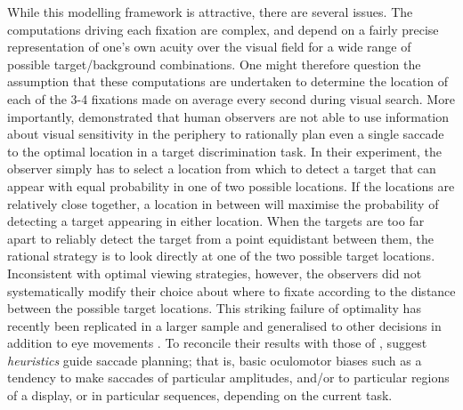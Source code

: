 While this modelling framework is attractive, there are several issues. The computations driving each fixation are complex, and depend on a fairly precise representation of one's own acuity over the visual field for a wide range of possible target/background combinations. One might therefore question the assumption that these computations are undertaken to determine the location of each of the 3-4 fixations made on average every second during visual search. More importantly,  \cite{morvan-maloney2012} demonstrated that human observers are not able to use information about visual sensitivity in the periphery to rationally plan even a single saccade to the optimal location in a target discrimination task. In their experiment, the observer simply has to select a location from which to detect a target that can appear with equal probability in one of two possible locations. If the locations are relatively close together, a location in between will maximise the probability of detecting a target appearing in either location. When the targets are too far apart to reliably detect the target from a point equidistant between them, the rational strategy is to look directly at one of the two possible target locations. Inconsistent with optimal viewing strategies, however, the observers did not systematically modify their choice about where to fixate according to the distance between the possible target locations. This striking failure of optimality has recently been replicated in a larger sample and generalised to other decisions in addition to eye movements  \citep{clarke-hunt2015}. To reconcile their results with those of  \cite{najemnik-geisler2008},  \cite{morvan-maloney2012} suggest \textit{heuristics} guide saccade planning; that is, basic oculomotor biases such as a tendency to make saccades of particular amplitudes, and/or to particular regions of a display, or in particular sequences, depending on the current task. 

